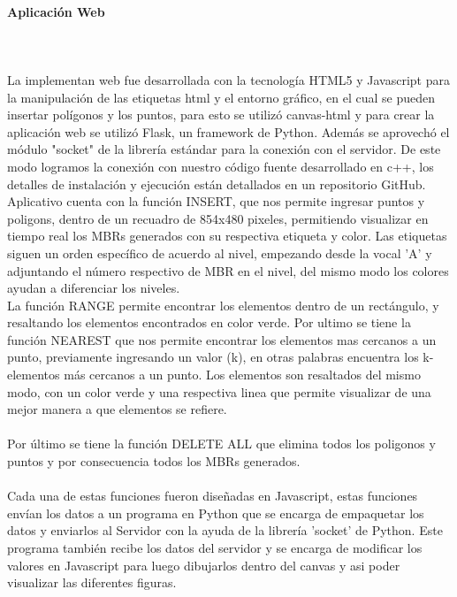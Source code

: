 \documentclass[12pt]{article}
\begin{document}
\paragraph*{Aplicación Web}~\\\\
La implementan web fue desarrollada con la tecnología HTML5 y Javascript para la manipulación de las etiquetas html y el entorno gráfico, en el cual se pueden insertar polígonos y los puntos, para esto se utilizó canvas-html y para crear la aplicación web se utilizó Flask, un framework de Python. Además se aprovechó el módulo "socket" de la librería estándar para la conexión con el servidor. De este modo logramos la conexión con nuestro código fuente desarrollado en c++, los detalles de instalación y ejecución están detallados en un repositorio GitHub.\\

Aplicativo cuenta con la función INSERT, que nos permite ingresar puntos y poligons, dentro de un recuadro de 854x480 pixeles, permitiendo visualizar en tiempo real los MBRs generados con su respectiva etiqueta y color. Las etiquetas siguen un orden específico de acuerdo al nivel, empezando desde la vocal 'A' y adjuntando el número respectivo de MBR en el nivel, del mismo modo los colores ayudan a diferenciar los niveles.\\

La función RANGE permite encontrar los elementos dentro de un rectángulo, y resaltando los elementos encontrados en color verde. Por ultimo se tiene la función NEAREST que nos permite encontrar los elementos mas cercanos a un punto, previamente ingresando un valor (k), en otras palabras encuentra los k-elementos más cercanos a un punto. Los elementos son resaltados del mismo modo, con un color verde y una respectiva linea que permite visualizar de una mejor manera a que elementos se refiere.\\\\
Por último se tiene la función DELETE ALL que elimina todos los poligonos y puntos y por consecuencia todos los MBRs generados.\\\\
Cada una de estas funciones fueron diseñadas en Javascript, estas funciones envían los datos a un programa en Python que se encarga de empaquetar los datos y enviarlos al Servidor con la ayuda de la librería 'socket' de Python. Este programa también recibe los datos del servidor y se encarga de modificar los valores en Javascript para luego dibujarlos dentro del canvas y asi poder visualizar las diferentes figuras. 
\end{document}
